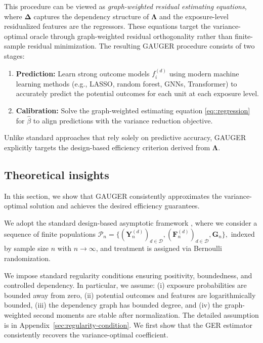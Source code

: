 \documentclass[twoside,letterpaper]{article}
\theoremstyle{plain}
\theoremstyle{definition}
\theoremstyle{remark}
\newcommand{\bY}{\boldsymbol{Y}}
\newcommand{\bG}{\boldsymbol{G}}
\newcommand{\bF}{\boldsymbol{F}}
\newcommand{\bLambda}{\boldsymbol{\Lambda}}
\newcommand{\bDelta}{\boldsymbol{\Delta}}
\newcommand{\cD}{\mathcal{D}}
\begin{document}
This procedure can be viewed as \emph{graph-weighted residual estimating equations}, where $\bDelta$ captures the dependency structure of $\bLambda$ and the exposure-level residualized features are the regressors. These equations target the variance-optimal oracle through graph-weighted residual orthogonality rather than finite-sample residual minimization. The resulting GAUGER procedure consists of two stages:

\begin{enumerate}[label=(S\arabic*)]
\item \textbf{Prediction:} Learn strong outcome models $f_i^{(d)}$ using modern machine learning methods (e.g., LASSO, random forest, GNNs, Transformer) to accurately predict the
potential outcomes for each unit at each exposure level.
\item \textbf{Calibration:} Solve the graph-weighted estimating equation \eqref{eq::regression} for $\hat{\beta}$ to align predictions with the variance reduction objective.
\end{enumerate}

Unlike standard approaches that rely solely on predictive accuracy, GAUGER explicitly targets the design-based efficiency criterion derived from $\bLambda$.

\subsection{Theoretical insights}
In this section, we show  that GAUGER consistently approximates the variance-optimal solution and achieves the desired efficiency guarantees.

We adopt the standard design-based asymptotic framework \citep{ding2024first, aronow2017estimating}, where we consider a sequence of finite populations 
$
\mathcal{P}_n = \{(\bY_n^{(d)})_{d\in\cD}, (\bF_n^{(d)})_{d\in\cD}, \bG_n\},
$ indexed by sample size $n$ with $n \to \infty$, and treatment is assigned via Bernoulli randomization. 





We impose standard regularity conditions ensuring positivity, boundedness, and controlled dependency. In particular, we assume:
(i) exposure probabilities are bounded away from zero,
(ii) potential outcomes and features are logarithmically bounded,
(iii) the dependency graph has bounded degree, and
(iv) the graph-weighted second moments are stable after normalization.  The detailed assumption is in Appendix~\ref{sec:regularity-condition}. We first show that the GER estimator consistently recovers the variance-optimal coefficient.
\end{document}
